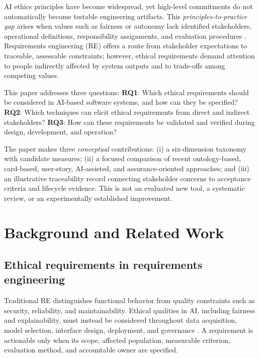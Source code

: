 \documentclass[11pt,a4paper]{article}
\begin{document}
AI ethics principles have become widespread, yet high-level commitments do not automatically become testable engineering artifacts. This \emph{principles-to-practice gap} arises when values such as fairness or autonomy lack identified stakeholders, operational definitions, responsibility assignments, and evaluation procedures \cite{mittelstadt2019,morley2020}. Requirements engineering (RE) offers a route from stakeholder expectations to traceable, assessable constraints; however, ethical requirements demand attention to people indirectly affected by system outputs and to trade-offs among competing values.

This paper addresses three questions: \textbf{RQ1}: Which ethical requirements should be considered in AI-based software systems, and how can they be specified? \textbf{RQ2}: Which techniques can elicit ethical requirements from direct and indirect stakeholders? \textbf{RQ3}: How can these requirements be validated and verified during design, development, and operation?

The paper makes three \emph{conceptual} contributions: (i) a six-dimension taxonomy with candidate measures; (ii) a focused comparison of recent ontology-based, card-based, user-story, AI-assisted, and assurance-oriented approaches; and (iii) an illustrative traceability record connecting stakeholder concerns to acceptance criteria and lifecycle evidence. This is not an evaluated new tool, a systematic review, or an experimentally established improvement.

\section{Background and Related Work}
\subsection{Ethical requirements in requirements engineering}
Traditional RE distinguishes functional behavior from quality constraints such as security, reliability, and maintainability. Ethical qualities in AI, including fairness and explainability, must instead be considered throughout data acquisition, model selection, interface design, deployment, and governance \cite{chung2000,horkoff2019,vogelsang2019}. A requirement is actionable only when its scope, affected population, measurable criterion, evaluation method, and accountable owner are specified.
\end{document}
